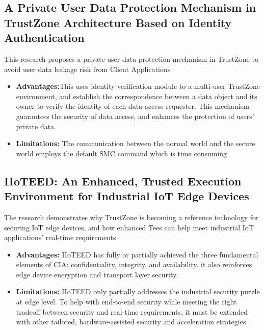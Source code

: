\documentclass[conference]{IEEEtran}
\begin{document}
\subsection{A Private User Data Protection Mechanism in TrustZone Architecture Based on Identity Authentication}
\cite{emb7} This research proposes a private user data protection mechanism in TrustZone to avoid user data leakage risk from Client Applications
\begin{itemize}
    \item \textbf{Advantages:}This uses identity verification module to a multi-user TrustZone environment, and establish the correspondence between a data object and its owner to verify the identity of each data access requester. This mechanism guarantees the security of data access, and enhances the protection of users’ private data.
    \item \textbf{Limitations:} The communication between the normal world and the secure world employs the default SMC command which is time consuming
\end{itemize}


\subsection{IIoTEED: An Enhanced, Trusted Execution Environment for Industrial IoT Edge Devices}
\cite{emb8} The research demonstrates why TrustZone is becoming a reference technology for securing IoT edge devices, and how enhanced Tees can help meet industrial IoT applications’ real-time requirements
\begin{itemize}
    \item \textbf{Advantages:} IIoTEED has fully or partially achieved the three fundamental elements of CIA: confidentiality, integrity, and availability. it also reinforces edge device encryption and transport layer security.
    \item \textbf{Limitations:} IIoTEED only partially addresses the industrial security puzzle at edge level. To help with end-to-end security while meeting the right tradeoff between security and real-time requirements, it must be extended with other tailored, hardware-assisted security and acceleration strategies
\end{itemize}
\end{document}
